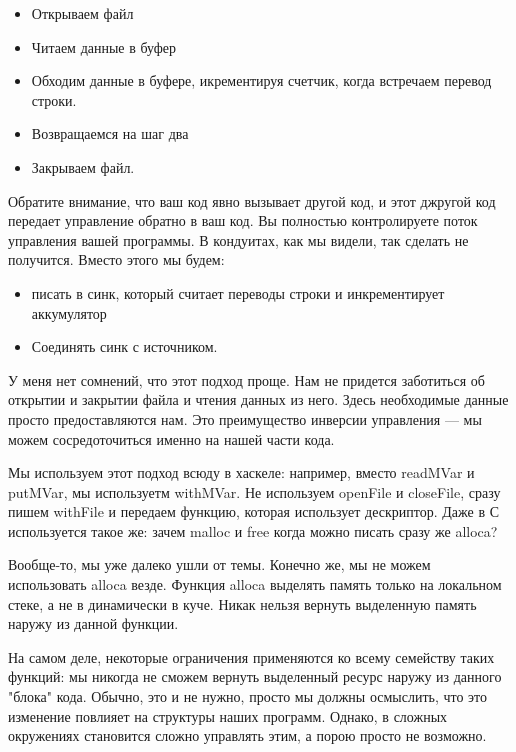 \begin{itemize}  
\item   Открываем файл
\item   Читаем данные в буфер
\item   Обходим данные в буфере, икрементируя счетчик, когда встречаем перевод строки.
\item   Возвращаемся на шаг два
\item   Закрываем файл.
\end{itemize}
Обратите внимание, что ваш код явно вызывает другой код, и этот джругой код передает управление обратно в ваш код. Вы полностью контролируете поток управления вашей программы. В кондуитах, как мы видели, так сделать не получится. Вместо этого мы будем:
\begin{itemize}
\item  писать в синк, который считает переводы строки и инкрементирует аккумулятор
\item  Соединять синк с источником.
\end{itemize} 
У меня нет сомнений, что этот подход проще. Нам не придется заботиться об открытии и закрытии файла и чтения данных из него. Здесь необходимые данные просто предоставляются нам. Это преимущество инверсии управления --- мы можем сосредоточиться именно на нашей части кода.

Мы используем этот подход всюду в хаскеле: например, вместо readMVar и putMVar, мы используетм withMVar. Не используем openFile и closeFile, сразу пишем withFile и передаем функцию, которая использует дескриптор. Даже в С используется такое же: зачем malloc и free когда можно писать сразу же alloca?

Вообще-то, мы уже далеко ушли от темы. Конечно же, мы не можем использовать alloca везде. Функция alloca выделять память только на локальном стеке, а не в динамически в куче. Никак нельзя вернуть выделенную память наружу из данной функции.

На самом деле, некоторые ограничения применяются ко всему семейству таких функций: мы никогда не сможем вернуть выделенный ресурс наружу из данного "блока" кода. Обычно, это и не нужно, просто мы должны осмыслить, что это изменение повлияет на структуры наших программ. Однако, в сложных окружениях становится сложно управлять этим, а порою просто не возможно. 

